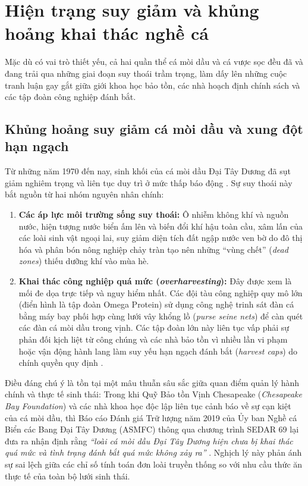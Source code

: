 \section{Hiện trạng suy giảm và khủng hoảng khai thác nghề cá}
\label{sec:intro_crises}

Mặc dù có vai trò thiết yếu, cả hai quần thể cá mòi dầu và cá vược sọc đều đã và đang trải qua những giai đoạn suy thoái trầm trọng, làm dấy lên những cuộc tranh luận gay gắt giữa giới khoa học bảo tồn, các nhà hoạch định chính sách và các tập đoàn công nghiệp đánh bắt.

\subsection{Khủng hoảng suy giảm cá mòi dầu và xung đột hạn ngạch}

Từ những năm 1970 đến nay, sinh khối của cá mòi dầu Đại Tây Dương đã sụt giảm nghiêm trọng và liên tục duy trì ở mức thấp báo động \cite{cbf2021menhaden}. Sự suy thoái này bắt nguồn từ hai nhóm nguyên nhân chính:
\begin{enumerate}
    \item \textbf{Các áp lực môi trường sống suy thoái:} Ô nhiễm không khí và nguồn nước, hiện tượng nước biển ấm lên và biến đổi khí hậu toàn cầu, xâm lấn của các loài sinh vật ngoại lai, suy giảm diện tích đất ngập nước ven bờ do đô thị hóa và phân bón nông nghiệp chảy tràn tạo nên những ``vùng chết'' (\textit{dead zones}) thiếu dưỡng khí vào mùa hè.
    \item \textbf{Khai thác công nghiệp quá mức (\textit{overharvesting}):} Đây được xem là mối đe dọa trực tiếp và nguy hiểm nhất. Các đội tàu công nghiệp quy mô lớn (điển hình là tập đoàn Omega Protein) sử dụng công nghệ trinh sát đàn cá bằng máy bay phối hợp cùng lưới vây khổng lồ (\textit{purse seine nets}) để càn quét các đàn cá mòi dầu trong vịnh. Các tập đoàn lớn này liên tục vấp phải sự phản đối kịch liệt từ công chúng và các nhà bảo tồn vì nhiều lần vi phạm hoặc vận động hành lang làm suy yếu hạn ngạch đánh bắt (\textit{harvest caps}) do chính quyền quy định \cite{ress2020chesapeake, cbf2021menhaden}.
\end{enumerate}

Điều đáng chú ý là tồn tại một mâu thuẫn sâu sắc giữa quan điểm quản lý hành chính và thực tế sinh thái: Trong khi Quỹ Bảo tồn Vịnh Chesapeake (\textit{Chesapeake Bay Foundation}) và các nhà khoa học độc lập liên tục cảnh báo về sự cạn kiệt của cá mòi dầu, thì Báo cáo Đánh giá Trữ lượng năm 2019 của Ủy ban Nghề cá Biển các Bang Đại Tây Dương (ASMFC) thông qua chương trình SEDAR 69 lại đưa ra nhận định rằng \textit{``loài cá mòi dầu Đại Tây Dương hiện chưa bị khai thác quá mức và tình trạng đánh bắt quá mức không xảy ra''} \cite{sedar2020menhaden}. Nghịch lý này phản ánh sự sai lệch giữa các chỉ số tính toán đơn loài truyền thống so với nhu cầu thức ăn thực tế của toàn bộ lưới sinh thái.

